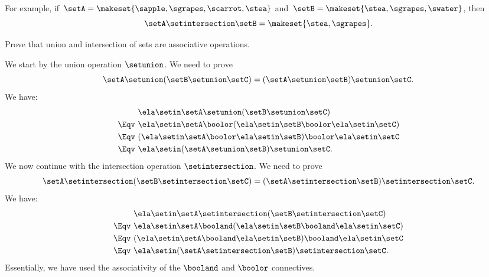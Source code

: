 For example, if~$\setA = \makeset{ \sapple, \sgrapes, \scarrot, \stea }$ and~$\setB = \makeset{ \stea, \sgrapes, \swater }$, then
\begin{equation}
    \setA \setintersection \setB = \makeset{ \stea, \sgrapes }.
\end{equation}

\begin{exercise}
    Prove that union and intersection of sets are associative operations.
\end{exercise}

\begin{solution}
    We start by the union operation $\setunion$.
    We need to prove
    \begin{equation*}
        \setA \setunion (\setB \setunion \setC)= (\setA \setunion \setB) \setunion \setC.
    \end{equation*}
    We have:
    \begin{equation*}
        \begin{split}
                    & \ela \setin \setA \setunion (\setB \setunion \setC)                     \\
            \Eqv \  & \ela \setin \setA \boolor (\ela \setin \setB \boolor \ela \setin \setC) \\
            \Eqv \  & (\ela \setin \setA \boolor \ela \setin \setB)\boolor \ela \setin \setC  \\
            \Eqv \  & \ela \setin (\setA \setunion \setB) \setunion \setC.
        \end{split}
    \end{equation*}
    We now continue with the intersection operation $\setintersection$.
    We need to prove
    \begin{equation*}
        \setA \setintersection (\setB \setintersection \setC)= (\setA \setintersection \setB) \setintersection \setC.
    \end{equation*}
    We have:
    \begin{equation*}
        \begin{split}
                    & \ela \setin \setA \setintersection (\setB \setintersection \setC)         \\
            \Eqv \  & \ela \setin \setA \booland (\ela \setin \setB \booland \ela \setin \setC) \\
            \Eqv \  & (\ela \setin \setA \booland \ela \setin \setB)\booland \ela \setin \setC  \\
            \Eqv \  & \ela \setin (\setA \setintersection \setB) \setintersection \setC.
        \end{split}
    \end{equation*}
    Essentially, we have used the associativity of the $\booland$ and $\boolor$ connectives.
\end{solution}

